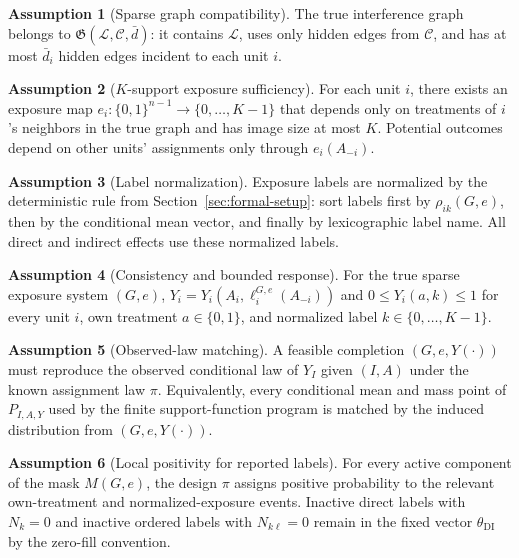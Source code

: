 \documentclass[11pt]{article}
\theoremstyle{definition}
\newtheorem{assumption}{Assumption}
\theoremstyle{plain}
\theoremstyle{remark}
\begin{document}
\begin{assumption}[Sparse graph compatibility]\label{ass:sparse}
The true interference graph belongs to \(\mathfrak G(\mathcal L,\mathcal C,\bar d)\): it contains \(\mathcal L\), uses only hidden edges from \(\mathcal C\), and has at most \(\bar d_i\) hidden edges incident to each unit \(i\).
\end{assumption}

\begin{assumption}[\(K\)-support exposure sufficiency]\label{ass:k-support}
For each unit \(i\), there exists an exposure map \(e_i:\{0,1\}^{n-1}\to\{0,\ldots,K-1\}\) that depends only on treatments of \(i\)'s neighbors in the true graph and has image size at most \(K\).  Potential outcomes depend on other units' assignments only through \(e_i(A_{-i})\).
\end{assumption}

\begin{assumption}[Label normalization]\label{ass:labels}
Exposure labels are normalized by the deterministic rule from Section~\ref{sec:formal-setup}: sort labels first by \(\rho_{ik}(G,e)\), then by the conditional mean vector, and finally by lexicographic label name.  All direct and indirect effects use these normalized labels.
\end{assumption}

\begin{assumption}[Consistency and bounded response]\label{ass:consistency}
For the true sparse exposure system \((G,e)\), \(Y_i=Y_i(A_i,\ell_i^{G,e}(A_{-i}))\) and \(0\le Y_i(a,k)\le1\) for every unit \(i\), own treatment \(a\in\{0,1\}\), and normalized label \(k\in\{0,\ldots,K-1\}\).
\end{assumption}

\begin{assumption}[Observed-law matching]\label{ass:matching}
A feasible completion \((G,e,Y(\cdot))\) must reproduce the observed conditional law of \(Y_I\) given \((I,A)\) under the known assignment law \(\pi\).  Equivalently, every conditional mean and mass point of \(P_{I,A,Y}\) used by the finite support-function program is matched by the induced distribution from \((G,e,Y(\cdot))\).
\end{assumption}

\begin{assumption}[Local positivity for reported labels]\label{ass:positivity}
For every active component of the mask \(M(G,e)\), the design \(\pi\) assigns positive probability to the relevant own-treatment and normalized-exposure events.  Inactive direct labels with \(N_k=0\) and inactive ordered labels with \(N_{k\ell}=0\) remain in the fixed vector \(\theta_{\mathrm{DI}}\) by the zero-fill convention.
\end{assumption}
\end{document}
